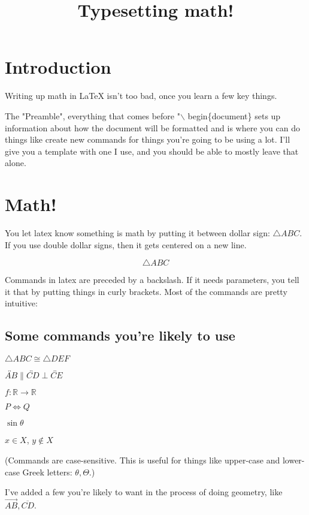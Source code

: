 \documentclass[11pt]{article}
\newcommand{\R}{\ensuremath{\mathbb R}}
\newcommand{\ray}[1]{\overrightarrow{#1}}
\renewcommand{\line}[1]{\overleftrightarrow{#1}}
\newcommand{\segment}[1]{\overline{#1}}
\theoremstyle{definition}
\begin{document}


\title{Typesetting math!}

\maketitle

\section{Introduction}

Writing up math in LaTeX isn't too bad, once you learn a few key things.

The "Preamble", everything that comes before "$\backslash$ begin\{document\} sets up information about how the document will be formatted and is where you can do things like create new commands for things you're going to be using a lot. I'll give you a template with one I use, and you should be able to mostly leave that alone.

\section{Math!}


You let latex know something is math by putting it between dollar sign: $\triangle ABC$. If you use double dollar signs, then it gets centered on a new line. 

$$\triangle ABC$$

Commands in latex are preceded by a backslash. If it needs parameters, you tell it that by putting things in curly brackets. Most of the commands are pretty intuitive: 

\subsection{Some commands you're likely to use}\label{commands}

$\triangle ABC \cong \triangle DEF$

$\line{AB} \parallel \line{CD} \perp \line{CE}$

$f\colon \R \to \R$

$P \iff Q$

$\sin{\theta}$

$x \in X$, $y \not\in X$

(Commands are case-sensitive. This is useful for things like upper-case and lower-case Greek letters: $\theta, \Theta$.)

I've added a few you're likely to want in the process of doing geometry, like $\ray{AB}, \segment{CD}$. 
\end{document}
